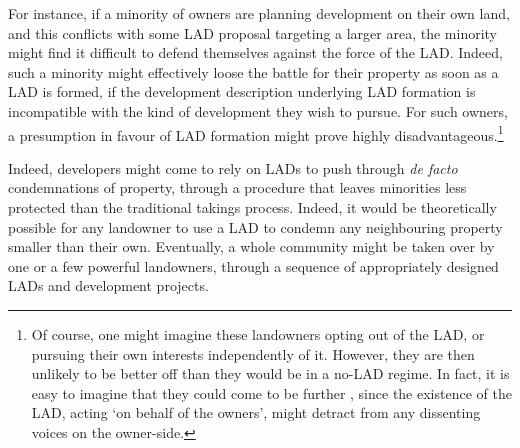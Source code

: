 For instance, if a minority of owners are planning development on their own land, and this conflicts with some LAD proposal targeting a larger area, the minority might find it difficult to defend themselves against the force of the LAD. Indeed, such a minority might effectively loose the battle for their property as soon as a LAD is formed, if the development description underlying LAD formation is incompatible with the kind of development they wish to pursue. For such owners, a presumption in favour of LAD formation might prove highly disadvantageous.\footnote{Of course, one might imagine these landowners opting out of the LAD, or pursuing their own interests independently of it. However, they are then unlikely to be better off than they would be in a no-LAD regime. In fact, it is easy to imagine that they could come to be further , since the existence of the LAD, acting `on behalf of the owners', might detract from any dissenting voices on the owner-side.} %

Indeed, developers might come to rely on LADs to push through {\it de facto} condemnations of property, through a procedure that leaves minorities less protected than the traditional takings process. Indeed, it would be theoretically possible for any landowner to use a LAD to condemn any neighbouring property smaller than their own. Eventually, a whole community might be taken over by one or a few powerful landowners, through a sequence of appropriately designed LADs and development projects. %

